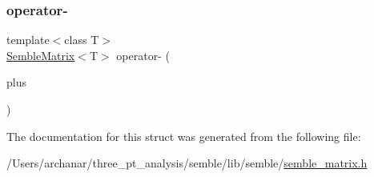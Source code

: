 \subsubsection{\texorpdfstring{operator-\/}{operator-}\hspace{0.1cm}{\footnotesize\ttfamily [2/2]}}
{\footnotesize\ttfamily template$<$class T$>$ \\
\mbox{\hyperlink{structSEMBLE_1_1SembleMatrix}{Semble\+Matrix}}$<$T$>$ operator-\/ (\begin{DoxyParamCaption}\item[{const \mbox{\hyperlink{structSEMBLE_1_1SembleMatrix}{Semble\+Matrix}}$<$ T $>$ \&}]{plus }\end{DoxyParamCaption})\hspace{0.3cm}{\ttfamily [friend]}}



The documentation for this struct was generated from the following file\+:\begin{DoxyCompactItemize}
\item 
/\+Users/archanar/three\+\_\+pt\+\_\+analysis/semble/lib/semble/\mbox{\hyperlink{lib_2semble_2semble__matrix_8h}{semble\+\_\+matrix.\+h}}\end{DoxyCompactItemize}
